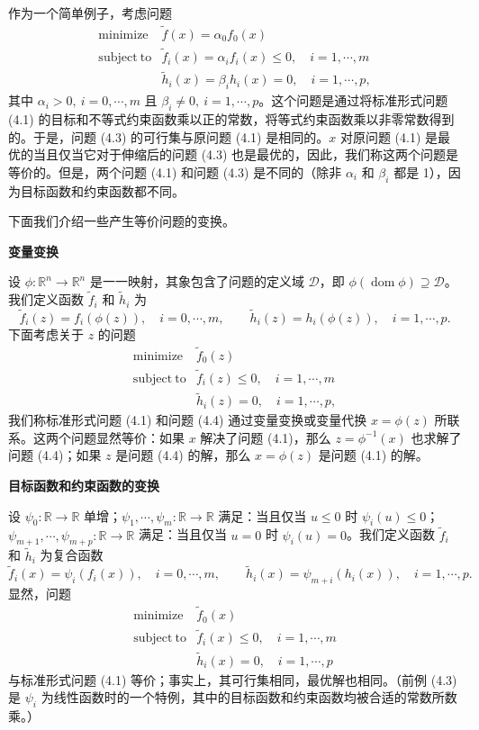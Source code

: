 \documentclass[UTF8,12pt,a4paper,fontset=fandol]{ctexart}
\begin{document}
作为一个简单例子，考虑问题
\begin{equation}
\begin{array}{ll}
\mathop{\mathrm{minimize}} & \tilde{f}(x)=\alpha_0f_0(x)\\
\mathrm{subject\ to} & \tilde{f}_i(x)=\alpha_i f_i(x)\leq 0,\quad i=1,\cdots,m\\
& \tilde{h}_i(x)=\beta_i h_i(x)=0,\quad i=1,\cdots,p,
\end{array}
\tag{4.3}
\end{equation}
其中 $\alpha_i>0,\ i=0,\cdots,m$ 且 $\beta_i\neq 0,\ i=1,\cdots,p$。这个问题是通过将标准形式问题 (4.1) 的目标和不等式约束函数乘以正的常数，将等式约束函数乘以非零常数得到的。于是，问题 (4.3) 的可行集与原问题 (4.1) 是相同的。$x$ 对原问题 (4.1) 是最优的当且仅当它对于伸缩后的问题 (4.3) 也是最优的，因此，我们称这两个问题是等价的。但是，两个问题 (4.1) 和问题 (4.3) 是不同的（除非 $\alpha_i$ 和 $\beta_i$ 都是 1），因为目标函数和约束函数都不同。

下面我们介绍一些产生等价问题的变换。

\noindent\textbf{变量变换}

设 $\phi:\mathbb{R}^n\to\mathbb{R}^n$ 是一一映射，其象包含了问题的定义域 $\mathcal{D}$，即 $\phi(\operatorname{dom}\phi)\supseteq\mathcal{D}$。我们定义函数 $\tilde{f}_i$ 和 $\tilde{h}_i$ 为
\[
\tilde{f}_i(z)=f_i(\phi(z)),\quad i=0,\cdots,m,\qquad
\tilde{h}_i(z)=h_i(\phi(z)),\quad i=1,\cdots,p.
\]
下面考虑关于 $z$ 的问题
\begin{equation}
\begin{array}{ll}
\mathop{\mathrm{minimize}} & \tilde{f}_0(z)\\
\mathrm{subject\ to} & \tilde{f}_i(z)\leq 0,\quad i=1,\cdots,m\\
& \tilde{h}_i(z)=0,\quad i=1,\cdots,p,
\end{array}
\tag{4.4}
\end{equation}
我们称标准形式问题 (4.1) 和问题 (4.4) 通过变量变换或变量代换 $x=\phi(z)$ 所联系。这两个问题显然等价：如果 $x$ 解决了问题 (4.1)，那么 $z=\phi^{-1}(x)$ 也求解了问题 (4.4)；如果 $z$ 是问题 (4.4) 的解，那么 $x=\phi(z)$ 是问题 (4.1) 的解。

\noindent\textbf{目标函数和约束函数的变换}

设 $\psi_0:\mathbb{R}\to\mathbb{R}$ 单增；$\psi_1,\cdots,\psi_m:\mathbb{R}\to\mathbb{R}$ 满足：当且仅当 $u\leq 0$ 时 $\psi_i(u)\leq 0$；$\psi_{m+1},\cdots,\psi_{m+p}:\mathbb{R}\to\mathbb{R}$ 满足：当且仅当 $u=0$ 时 $\psi_i(u)=0$。我们定义函数 $\tilde{f}_i$ 和 $\tilde{h}_i$ 为复合函数
\[
\tilde{f}_i(x)=\psi_i(f_i(x)),\quad i=0,\cdots,m,\qquad
\tilde{h}_i(x)=\psi_{m+i}(h_i(x)),\quad i=1,\cdots,p.
\]
显然，问题
\[
\begin{array}{ll}
\mathop{\mathrm{minimize}} & \tilde{f}_0(x)\\
\mathrm{subject\ to} & \tilde{f}_i(x)\leq 0,\quad i=1,\cdots,m\\
& \tilde{h}_i(x)=0,\quad i=1,\cdots,p
\end{array}
\]
与标准形式问题 (4.1) 等价；事实上，其可行集相同，最优解也相同。（前例 (4.3) 是 $\psi_i$ 为线性函数时的一个特例，其中的目标函数和约束函数均被合适的常数所数乘。）
\end{document}
